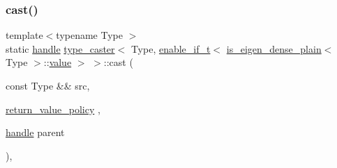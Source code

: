 \subsubsection{\texorpdfstring{cast()}{cast()}\hspace{0.1cm}{\footnotesize\ttfamily [2/6]}}
{\footnotesize\ttfamily template$<$typename Type $>$ \\
static \mbox{\hyperlink{classhandle}{handle}} \mbox{\hyperlink{classtype__caster}{type\+\_\+caster}}$<$ Type, \mbox{\hyperlink{detail_2common_8h_a012819c9e8b5e04872a271f50f8b8196}{enable\+\_\+if\+\_\+t}}$<$ \mbox{\hyperlink{eigen_8h_a93c6985faade6e9052f9e0917826b26d}{is\+\_\+eigen\+\_\+dense\+\_\+plain}}$<$ Type $>$\+::\mbox{\hyperlink{_s_d_l__opengl__glext_8h_a8ad81492d410ff2ac11f754f4042150f}{value}} $>$ $>$\+::cast (\begin{DoxyParamCaption}\item[{const Type \&\&}]{src,  }\item[{\mbox{\hyperlink{detail_2common_8h_adde72ab1fb0dd4b48a5232c349a53841}{return\+\_\+value\+\_\+policy}}}]{,  }\item[{\mbox{\hyperlink{classhandle}{handle}}}]{parent }\end{DoxyParamCaption})\hspace{0.3cm}{\ttfamily [inline]}, {\ttfamily [static]}}

\mbox{\label{structtype__caster_3_01_type_00_01enable__if__t_3_01is__eigen__dense__plain_3_01_type_01_4_1_1value_01_4_01_4_a03fb62073335cac48802bf5e347aca87}} 
